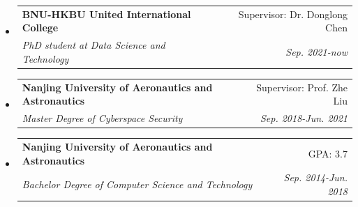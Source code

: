 \documentclass[letterpaper,11pt]{article}
\makeatletter
\newcommand{\resitem}[1]{\item #1 \vspace{-2pt}}
\newcommand{\ressubheading}[4]{
\begin{tabular*}{6.5in}{l@{\cftdotfill{\cftsecdotsep}\extracolsep{\fill}}r}
		\textbf{#1} & #2 \\
		\textit{#3} & \textit{#4} \\
\end{tabular*}\vspace{-6pt}}
\makeatother
\begin{document}
\begin{itemize}
\item
	\ressubheading{BNU-HKBU United International College}{Supervisor: Dr. Donglong Chen}{PhD student at Data Science and Technology}{Sep. 2021-now}
%
\item
	\ressubheading{Nanjing University of Aeronautics and Astronautics}{Supervisor: Prof. Zhe Liu}{Master Degree of Cyberspace Security}{Sep. 2018-Jun. 2021}
%

\item
	\ressubheading{Nanjing University of Aeronautics and Astronautics}{GPA: 3.7}{Bachelor Degree of Computer Science and Technology}{Sep. 2014-Jun. 2018}
%

\end{itemize}
\end{document}
